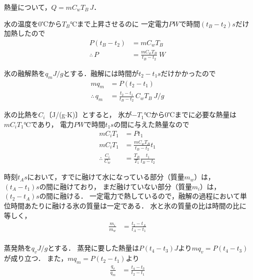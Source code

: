 \begin{comment}

\end{comment}
熱量について，$Q=mC_w T_B\,\unit{J}$．

水の温度を0℃から$T_B\unit{℃}$まで上昇させるのに
一定電力$P\unit{W}$で時間$(t_B-t_2)\unit{s}$だけ加熱したので
\begin{align*}
  P(t_B-t_2) &= mC_wT_B\\
  \therefore\, P &= \frac{mC_wT_B}{t_B-t_2}\ \unit{W}
\end{align*}

氷の融解熱を$q_m\unit{J/g}$とする．融解には時間が$t_2-t_1\unit{s}$だけかかったので
\begin{align*}
  mq_m &= P(t_2-t_1)\\
  \therefore\, q_m &= \frac{t_2-t_1}{t_B-t_2}\,C_w T_B\ \unit{J/g}
\end{align*}

氷の比熱を$C_i$〔J/(g$\cdot$K)〕とすると，
氷が$-T_1\unit{℃}$から0℃までに必要な熱量は$mC_iT_1\unit{℃}$であり，
電力$P\unit{W}$で時間$t_1\unit{s}$の間に与えた熱量なので
\begin{align*}
  mC_iT_1 &= Pt_1\\
  mC_iT_1 &= \frac{mC_wT_B}{t_B-t_2}t_1\\
  \therefore\, \frac{C_i}{C_w} &= \frac{T_B}{T_1}\frac{t_1}{t_B-t_2}
\end{align*}

時刻$t_A\unit{s}$において，すでに融けて水になっている部分（質量$m_w$）は，
$(t_A-t_1)\unit{s}$の間に融けており，
まだ融けていない部分（質量$m_i$）は，$(t_2-t_A)\unit{s}$の間に融ける．
一定電力で熱しているので，融解の過程において単位時間あたりに融ける氷の質量は一定である．
水と氷の質量の比は時間の比に等しく，
\begin{align*}
  \frac{m_i}{m_w} &= \frac{t_2-t_A}{t_A-t_1}\\
\end{align*}

蒸発熱を$q_v\unit{J/g}$とする．
蒸発に要した熱量は$P(t_4-t_3)\unit{J}$より$mq_v=P(t_4-t_3)$が成り立つ．
また，$mq_m = P(t_2-t_1)$より
\begin{align*}
  \frac{q_v}{q_m} &= \frac{t_4-t_3}{t_2-t_1}
\end{align*}

